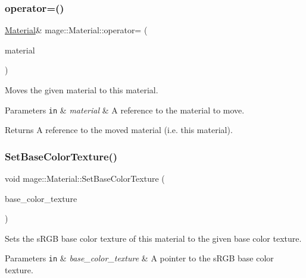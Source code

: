 \subsubsection{\texorpdfstring{operator=()}{operator=()}\hspace{0.1cm}{\footnotesize\ttfamily [2/2]}}
{\footnotesize\ttfamily \hyperlink{classmage_1_1_material}{Material}\& mage\+::\+Material\+::operator= (\begin{DoxyParamCaption}\item[{\hyperlink{classmage_1_1_material}{Material} \&\&}]{material }\end{DoxyParamCaption})\hspace{0.3cm}{\ttfamily [default]}}

Moves the given material to this material.


\begin{DoxyParams}[1]{Parameters}
\mbox{\tt in}  & {\em material} & A reference to the material to move. \\
\hline
\end{DoxyParams}
\begin{DoxyReturn}{Returns}
A reference to the moved material (i.\+e. this material). 
\end{DoxyReturn}
\hypertarget{classmage_1_1_material_a85f9544a9d26f252a27a3bc6c271456a}{}\label{classmage_1_1_material_a85f9544a9d26f252a27a3bc6c271456a} 
\subsubsection{\texorpdfstring{Set\+Base\+Color\+Texture()}{SetBaseColorTexture()}}
{\footnotesize\ttfamily void mage\+::\+Material\+::\+Set\+Base\+Color\+Texture (\begin{DoxyParamCaption}\item[{\hyperlink{namespacemage_a1e01ae66713838a7a67d30e44c67703e}{Shared\+Ptr}$<$ const \hyperlink{classmage_1_1_texture}{Texture} $>$}]{base\+\_\+color\+\_\+texture }\end{DoxyParamCaption})\hspace{0.3cm}{\ttfamily [noexcept]}}

Sets the s\+R\+GB base color texture of this material to the given base color texture.


\begin{DoxyParams}[1]{Parameters}
\mbox{\tt in}  & {\em base\+\_\+color\+\_\+texture} & A pointer to the s\+R\+GB base color texture. \\
\hline
\end{DoxyParams}
\hypertarget{classmage_1_1_material_a9b0bcb448cf9c96bcb63dcbc0f110bd1}{}\label{classmage_1_1_material_a9b0bcb448cf9c96bcb63dcbc0f110bd1} 
